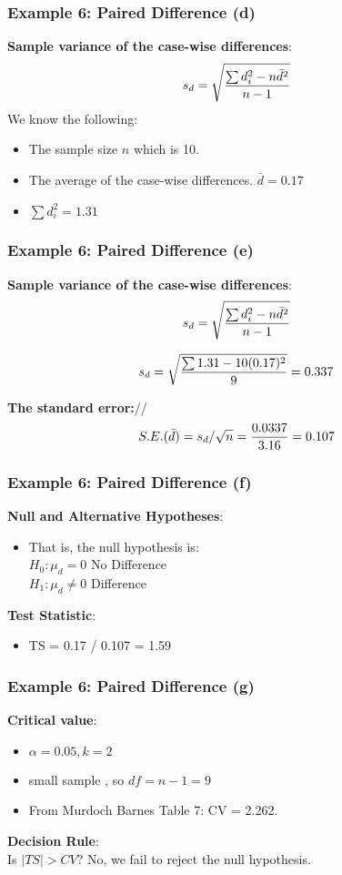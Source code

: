 \begin{frame}
\frametitle{Example 6: Paired Difference (d)}
\textbf{Sample variance of the case-wise differences}:\\
\large
\[s_d = \sqrt{ {\sum d_i^2 - n\bar{d}^2 \over n-1}}\]
We know the following:
\begin{itemize}
\item The sample size $n$ which is 10.
\item The average of the case-wise differences. $\bar{d} = 0.17$
\item  $\sum d^2_i = 1.31$
\end{itemize}
\end{frame}



\begin{frame}
\frametitle{Example 6: Paired Difference (e)}
\textbf{Sample variance of the case-wise differences}:\\
\[s_d = \sqrt{ {\sum d_i^2 - n\bar{d}^2 \over n-1}}\]

\[s_d = \sqrt{ {\sum 1.31 - 10(0.17)^2 \over 9}} = 0.337\]

\textbf{The standard error:}// \[ S.E.(\bar{d}) = s_d / \sqrt{n} = {0.0337 \over 3.16} = 0.107\]
\end{frame}

\begin{frame}
\frametitle{Example 6: Paired Difference (f)}
\textbf{Null and Alternative Hypotheses}:\\
\begin{itemize}
\item That is, the null hypothesis is:\\
$H_0: \mu_d = 0$ No Difference\\
$H_1: \mu_d \neq 0$ Difference \\
\end{itemize}
\textbf{Test Statistic}:\\
\begin{itemize}
\item TS = 0.17 / 0.107 = 1.59
\end{itemize}
\end{frame}

\begin{frame}
\frametitle{Example 6: Paired Difference (g)}
\textbf{Critical value}:
\begin{itemize}
\item $\alpha = 0.05, k = 2$ \item small sample , so $df = n-1 = 9$
\item From Murdoch Barnes Table 7: CV = 2.262.
\end{itemize}
\bigskip
\textbf{Decision Rule}:\\
Is $|TS| > CV$? No, we fail to reject the null hypothesis.
\end{frame}




